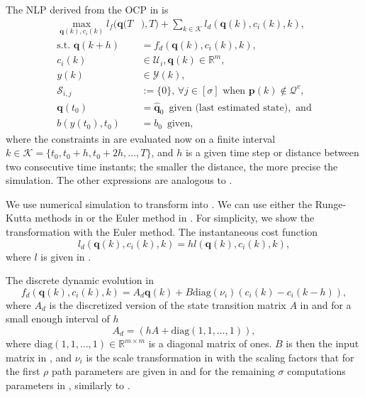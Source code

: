 The NLP derived from the OCP in  is
\begin{subequations}\label{eq:disc-ocp-output-mpc}\begin{align}
  \max_{\mathbf{q}(k),c_i(k)}{l_f(\mathbf{q}(T}&{),T)+\sum_{k\in\mathcal{K}}{l_d(\mathbf{q}(k),c_i(k),k)}},\\
  \text{s.t. }\mathbf{q}(k+h)&=f_d(\mathbf{q}(k),c_i(k),k),\label{eq:disc-dyn-evol}\\
  c_i(k)&\in\mathcal{U}_i,\mathbf{q}(k)\in\mathbb{R}^m,\label{eq:disc-state-cont-const-mpc}\\
  y(k)&\in\mathcal{Y}(k),\label{eq:disc-batt-const-mpc}\\
  \mathcal{S}_{i,j}&:=\{0\},\,\forall j \in [\sigma]\text{ when }\mathbf{p}(k)\notin\mathcal{Q}^v,\label{eq:disc-polyg-const}\\
  \mathbf{q}(t_0)&=\hat{\mathbf{q}}_0\,\,\,\text{given (last estimated state)},\text{ and}\\
  b(y(t_0),t_0)&=b_0\,\,\,\text{given},
\end{align}\end{subequations}
where the constraints in  are evaluated now on a finite interval $k\in\mathcal{K}=\{t_0,t_0+h,t_0+2h,\dots,T\}$, and $h$ is a given time step or distance between two  consecutive time instants; the smaller the distance, the more precise the simulation. The other expressions are analogous to .

We use numerical simulation to transform  into . We can use either the Runge-Kutta methods in  or the Euler method in . For simplicity, we show the transformation with the Euler method. The instantaneous cost function
\begin{equation}\label{eq:mpc-cost-euler}
  l_d(\mathbf{q}(k),c_i(k),k)=hl(\mathbf{q}(k),c_i(k),k),
\end{equation}
where $l$ is given in .

The discrete dynamic evolution in 
\begin{equation}
  f_d(\mathbf{q}(k),c_i(k),k)=A_d\mathbf{q}(k)+B\mathrm{diag}(\nu_i)(c_i(k)-c_i(k-h)),
\end{equation}
where $A_d$ is the discretized version of the state transition matrix $A$ in  and for a small enough interval of $h$
\begin{equation}
A_d=(hA+\mathrm{diag}(1,1,\dots,1)),
\end{equation}
where $\mathrm{diag}(1,1,\dots,1)\in\mathbb{R}^{m\times m}$ is a diagonal matrix of ones. $B$ is then the input matrix in , and $\nu_i$ is the scale transformation in  with the scaling factors that for the first $\rho$ path parameters are given in  and for the remaining $\sigma$ computations parameters in , similarly to .

